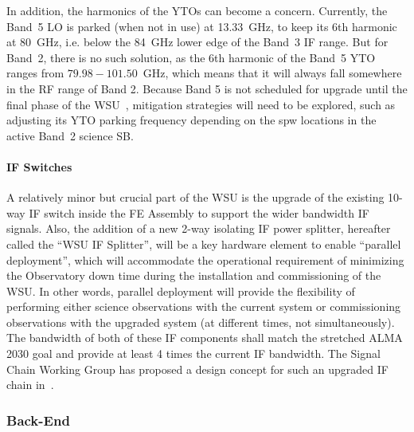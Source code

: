 In addition, the harmonics of the YTOs can become a concern.  Currently, the Band~5 LO is parked (when not in use) at 13.33~GHz, to keep its 6th harmonic at 80~GHz, i.e. below the 84~GHz lower edge of the Band~3 IF range. But for Band~2, there is no such solution, as the 6th harmonic of the Band~5 YTO ranges from $79.98-101.50$~GHz, which means that it will always fall somewhere in the RF range of Band 2.   Because Band 5 is not scheduled for upgrade until the final phase of the WSU~\cite{imp_plan}, mitigation strategies will need to be explored, such as adjusting its YTO parking frequency depending on the spw locations in the active Band~2 science SB. 


\paragraph{IF Switches}
A relatively minor but crucial part of the WSU is the upgrade of the existing 10-way IF switch inside the FE Assembly to support the wider bandwidth IF signals.  Also, the addition of a new 2-way isolating IF power splitter, hereafter called the ``WSU IF Splitter'', will be a key hardware element to enable “parallel deployment”, which will accommodate the operational requirement of minimizing the Observatory down time during the installation and commissioning of the WSU.  In other words, parallel deployment will provide the flexibility of performing either science observations with the current system or commissioning observations with the upgraded system (at different times, not simultaneously). The bandwidth of both of these IF components shall match the stretched ALMA 2030 goal and provide at least 4 times the current IF bandwidth.  The Signal Chain Working Group has proposed a design concept for such an upgraded IF chain in~\cite{scwg}.


\subsubsection{Back-End}

